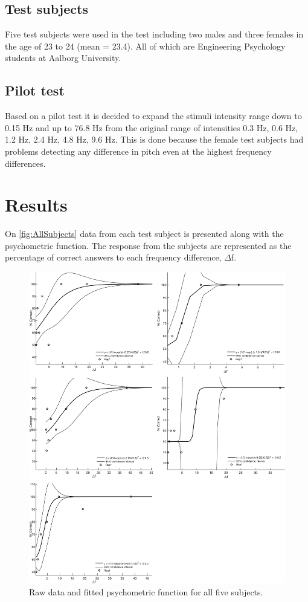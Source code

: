\subsection*{Test subjects}
%
Five test subjects were used in the test including two males and three females in the age of 23 to 24 (mean = 23.4). All of which are Engineering Psychology students at Aalborg University.

\subsection*{Pilot test}
%
Based on a pilot test it is decided to expand the stimuli intensity range down to 0.15 Hz and up to 76.8 Hz from the original range of intensities 0.3 Hz, 0.6 Hz, 1.2 Hz, 2.4 Hz, 4.8 Hz, 9.6 Hz. This is done because the female test subjects had problems detecting any difference in pitch even at the highest frequency differences.

\section*{Results}
%
On \autoref{fig:AllSubjects} data from each test subject is presented along with the psychometric function. The response from the subjects are represented as the percentage of correct answers to each frequency difference, $\Delta$f.
% 
\begin{figure}[H]
\centering
\includegraphics[width = \textwidth]{Figure/Vores_Figurer/AllSubjects.png} 
\caption{Raw data and fitted psychometric function for all five subjects.}
\label{fig:AllSubjects}
\end{figure}
%
